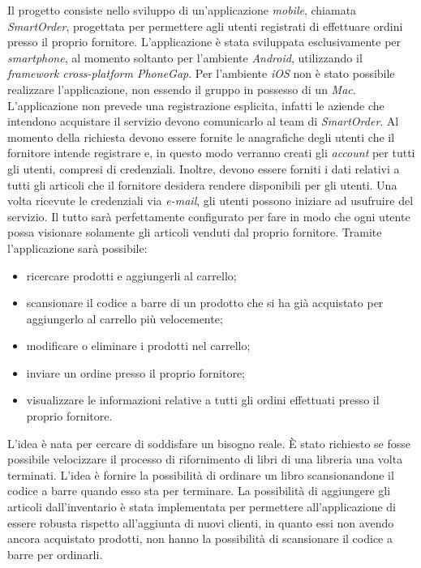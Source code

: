 \documentclass[12pt, a4paper, titlepage]{report}
\begin{document}
	Il progetto consiste nello sviluppo di un'applicazione \textit{mobile}, chiamata \textit{SmartOrder}, progettata per permettere agli utenti registrati di effettuare ordini presso il proprio fornitore. L'applicazione è stata sviluppata esclusivamente per \textit{smartphone}, al momento soltanto per l'ambiente \textit{Android}, utilizzando il \textit{framework cross-platform PhoneGap}. Per l'ambiente \textit{iOS} non è stato possibile realizzare l'applicazione, non essendo il gruppo in possesso di un \textit{Mac}. L'applicazione non prevede una registrazione esplicita, infatti le aziende che intendono acquistare il servizio devono comunicarlo al team di \textit{SmartOrder}. Al momento della richiesta devono essere fornite le anagrafiche degli utenti che il fornitore intende registrare e, in questo modo verranno creati gli \textit{account} per tutti gli utenti, compresi di credenziali. Inoltre, devono essere forniti i dati relativi a tutti gli articoli che il fornitore desidera rendere disponibili per gli utenti. Una volta ricevute le credenziali via \textit{e-mail}, gli utenti possono iniziare ad usufruire del servizio. Il tutto sarà perfettamente configurato per fare in modo che ogni utente possa visionare solamente gli articoli venduti dal proprio fornitore. Tramite l'applicazione sarà possibile:
	\begin{itemize}
		\item ricercare prodotti e aggiungerli al carrello;
		\item scansionare il codice a barre di un prodotto che si ha già acquistato per aggiungerlo al carrello più velocemente;
		\item modificare o eliminare i prodotti nel carrello;
		\item inviare un ordine presso il proprio fornitore;
		\item visualizzare le informazioni relative a tutti gli ordini effettuati presso il proprio fornitore.
	\end{itemize}
	L'idea è nata per cercare di soddisfare un bisogno reale. È stato richiesto se fosse possibile velocizzare il processo di rifornimento di libri di una libreria una volta terminati. L'idea è fornire la possibilità di ordinare un libro scansionandone il codice a barre quando esso sta per terminare. La possibilità di aggiungere gli articoli dall'inventario è stata implementata per permettere all'applicazione di essere robusta rispetto all'aggiunta di nuovi clienti, in quanto essi non avendo ancora acquistato prodotti, non hanno la possibilità di scansionare il codice a barre per ordinarli.
	\medskip
	
\end{document}
